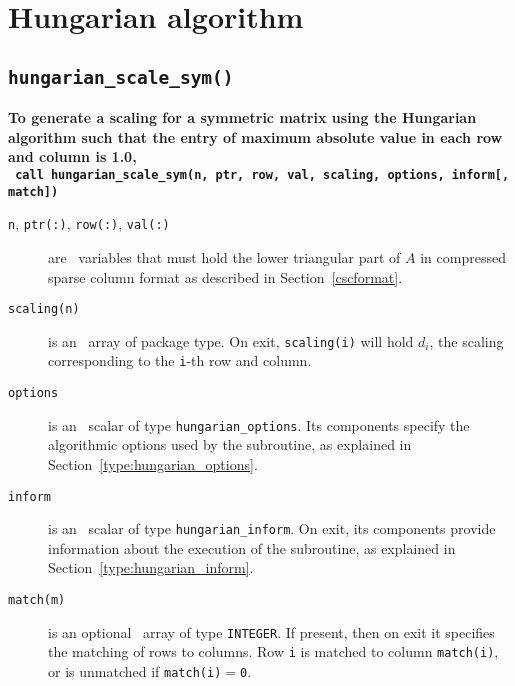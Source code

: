 
\section{Hungarian algorithm}

\subsection{\texttt{hungarian\_scale\_sym()}}

\textbf{\noindent
   To generate a scaling for a symmetric matrix using the Hungarian algorithm such that the entry of maximum absolute value in each row and column is 1.0,
   \vspace*{0.3cm} \\
   \texttt{ \hspace*{0.2cm}
      call hungarian\_scale\_sym(n, ptr, row, val, scaling, options, inform[, match])
   }
   \vspace{0.3cm}
}

\begin{description}

\item[\texttt{n}, \texttt{ptr(:)}, \texttt{row(:)}, \texttt{val(:)}] are \intentin\ variables that must hold the lower triangular part of $A$ in compressed sparse column format as described in Section~\ref{cscformat}.

\item[\texttt{scaling(n)}] is an \intentout\ array of package type. On exit,
\texttt{scaling(i)} will hold $d_i$, the scaling corresponding to the
\texttt{i}-th row and column.

\item[\texttt{options}] is an \intentin\ scalar of type \texttt{hungarian\_options}. Its components specify the algorithmic options used by the subroutine, as explained in Section~\ref{type:hungarian_options}.

\item[\texttt{inform}] is an \intentout\ scalar of type \texttt{hungarian\_inform}. On exit, its components provide information about the execution of the subroutine, as explained in Section~\ref{type:hungarian_inform}.

\item[\texttt{match(m)}] is an optional \intentout\ array of type {\tt INTEGER}.
If present, then on exit it specifies the matching of rows to
columns. Row \texttt{i} is matched to column \texttt{match(i)}, or is unmatched
if \texttt{match(i)}$=$\texttt{0}.

\end{description}


